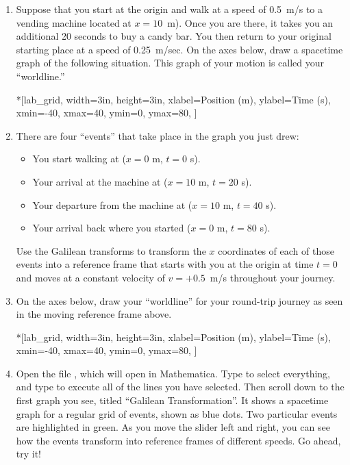 \begin{enumerate}[labparts]

\item Suppose that you start at the origin and walk at a speed of 0.5~m/s to a vending machine located at $x=10$~m).  Once you are there, it takes you an additional 20 seconds to buy a candy bar.  You then return to your original starting place at a speed of 0.25~m/sec. On the axes below, draw a spacetime graph of the following situation.  This graph of your motion is called your ``worldline.''

\begin{lab_axis}*[lab_grid,
	width=3in, height=3in,
	xlabel={Position (m)},
	ylabel={Time (s)},
	xmin=-40, xmax=40,
	ymin=0, ymax=80,
	]
\end{lab_axis}

\pagebreak[2]
\item There are four ``events'' that take place in the graph you just drew:
\begin{itemize}[nosep]
\item You start walking at ($x=0$ m, $t=0$ s).
\item Your arrival at the machine at ($x=10$ m, $t=20$ s).
\item Your departure from the machine at ($x=10$ m, $t=40$ s).
\item Your arrival back where you started ($x=0$ m, $t=80$ s).
\end{itemize}
Use the Galilean transforms to transform the $x$ coordinates of each of those events into a reference frame that starts with you at the origin at time $t=0$ and moves at a constant velocity of $v=+0.5$~m/s throughout your journey.
\answerspace{1in}

\item On the axes below, draw your ``worldline'' for your round-trip journey as seen in the moving reference frame above.

\begin{lab_axis}*[lab_grid,
	width=3in, height=3in,
	xlabel={Position (m)},
	ylabel={Time (s)},
	xmin=-40, xmax=40,
	ymin=0, ymax=80,
	]
\end{lab_axis}

\item Open the file , which will open in Mathematica.  Type  to select everything, and type  to execute all of the lines you have selected.  Then scroll down to the first graph you see, titled ``Galilean Transformation''.    It shows a spacetime graph for a regular grid of events, shown as blue dots.  Two particular events are highlighted in green.  As you move the slider left and right, you can see how the events transform into reference frames of different speeds.  Go ahead, try it!


\end{enumerate}
